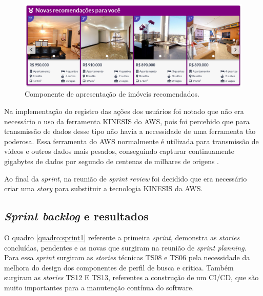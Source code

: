 \begin{figure}[H]
    \centering
    \includegraphics[scale=0.42]{figuras/desenvolvimento/componente_ml.png}
    \caption[Componente de apresentação de imóveis recomendados]{Componente de apresentação de imóveis recomendados.}
    \label{fig:componente_ml}
\end{figure}

Na implementação do registro das ações dos usuários foi notado que não era necessário o uso da ferramenta KINESIS do AWS, pois foi percebido que para transmissão de dados desse tipo não havia a necessidade de uma ferramenta tão poderosa. Essa ferramenta do AWS normalmente é utilizada para transmissão de vídeos e outros dados mais pesados, conseguindo capturar continuamente gigabytes de dados por segundo de centenas de milhares de origens \cite{KINESIS:2019}.

Ao final da \textit{sprint}, na reunião de \textit{sprint review} foi decidido que era necessário criar uma \textit{story} para substituir a tecnologia KINESIS da AWS.

\subsection{\textit{Sprint backlog} e resultados}

O quadro \ref{quadro:sprint1} referente a primeira \textit{sprint}, demonstra as \textit{stories} concluídas, pendentes e as novas que surgiram na reunião de \textit{sprint planning}. Para essa \textit{sprint} surgiram as \textit{stories} técnicas TS08 e TS06 pela necessidade da melhora do design dos componentes de perfil de busca e crítica. Também surgiram as \textit{stories} TS12 E TS13, referentes a construção de um CI/CD, que são muito importantes para a manutenção contínua do software.

